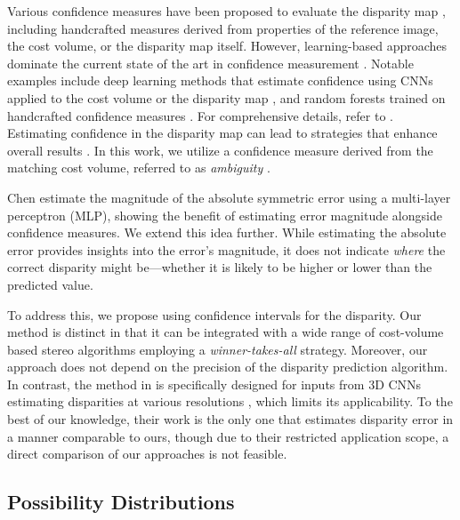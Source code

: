 Various confidence measures have been proposed to evaluate the disparity map \cite{hu_quantitative_2012}, including handcrafted measures derived from properties of the reference image, the cost volume, or the disparity map itself. However, learning-based approaches dominate the current state of the art in confidence measurement \cite{poggi_confidence_2021}. Notable examples include deep learning methods that estimate confidence using CNNs applied to the cost volume \cite{mehltretter_cnn-based_2019} or the disparity map \cite{poggi_learning_2016}, and random forests trained on handcrafted confidence measures \cite{gouveia_confidence_2015}. For comprehensive details, refer to \cite{poggi_confidence_2021, hu_quantitative_2012}. Estimating confidence in the disparity map can lead to strategies that enhance overall results \cite{dumas_improving_2022, tosi_leveraging_2019, hollmann_geometry-based_2020}. In this work, we utilize a confidence measure derived from the matching cost volume, referred to as \textit{ambiguity} \cite{sarrazin_ambiguity_2021}.

Chen \etal \cite{chen_learning_2023} estimate the magnitude of the absolute symmetric error using a multi-layer perceptron (MLP), showing the benefit of estimating error magnitude alongside confidence measures. We extend this idea further. While estimating the absolute error provides insights into the error's magnitude, it does not indicate \textit{where} the correct disparity might be—whether it is likely to be higher or lower than the predicted value.

To address this, we propose using confidence intervals for the disparity. Our method is distinct in that it can be integrated with a wide range of cost-volume based stereo algorithms employing a \textit{winner-takes-all} strategy. Moreover, our approach does not depend on the precision of the disparity prediction algorithm. In contrast, the method in \cite{chen_learning_2023} is specifically designed for inputs from 3D CNNs estimating disparities at various resolutions \cite{guo_group-wise_2019}, which limits its applicability. To the best of our knowledge, their work is the only one that estimates disparity error in a manner comparable to ours, though due to their restricted application scope, a direct comparison of our approaches is not feasible.

\subsection{Possibility Distributions}

